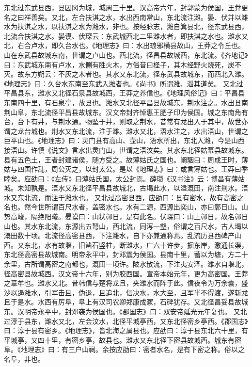 \documentclass[12pt,UTF8]{ctexbook}
\begin{document}
东北过东武县西，县因冈为城，城周三十里。汉高帝六年，封郭蒙为侯国，王莽更名之曰祥善矣。又北，左合扶淇之水，水出西南常山，东北流注潍。晏、伏并以潍水为扶淇之水，以扶淇之水为潍水，非也。按经脉志，潍自箕县北，径东武县西，北流合扶淇之水。晏谟、伏琛云：东武城西北二里潍水者，即扶淇之水也。潍水又北，右合卢水，即久台水也。《地理志》曰：水出琅邪横县故山，王莽之令丘也。山在东武县故城东南，世谓之卢山也。西北流，径昌县故城西，东北流。《齐地记》曰：东武城东南有卢水，水侧有胜火木，方俗音曰柽子，其木经野火烧死，炭不灭。故东方朔云：不灰之木者也。其水又东北流，径东武县故城东，而西北入潍。《地理志》曰：久台水东南至东武入潍者也。《尚书》所谓潍、淄其道矣。
又北过平昌县东，潍水又北径石泉县故城西，王莽之养信也。《地理风俗记》曰：平昌县东南四十里，有石泉亭，故县也。潍水又北径平昌县故城东，荆水注之。水出县南荆山阜，东北流径平昌县故城东。汉文帝封齐悼惠王肥子印为侯国。城之东南角有台，台下有井，与荆水通。物坠于井，则取之荆水，昔常有龙出入于其中，故世亦谓之龙台城也。荆水又东北流，注于潍。潍水又北，浯水注之，水出浯山，世谓之巨平山也。《地理志》曰：灵门县有高山、壶山，浯水所出，东北入潍，今是山西接浯山。许慎《说文》言水出灵门山，世谓之浯汶矣。其水东北径姑幕县故城东。县有五色土，王者封建诸侯，随方受之。故薄姑氏之国也。阚駰曰：周成王时，薄姑与四国作乱，周公灭之，以封太公。是以《地理志》曰：或言薄姑也。王莽曰季睦矣。应劭曰：《左传》曰薄姑氏国，太公封焉。薛瓒《汉书注》云：博昌有薄姑城。未知孰是。浯水又东北径平昌县故城北，古堨此水，以溢溉田，南注荆水。浯水又东北流，而注于潍水也。
又北过高密县西，应劭曰：县有密水，故有高密之名也。然今世所谓百尺水者，盖密水也。水有二源，西源出奕山，亦曰鄣日山。山势高峻，隔绝阳曦。晏谟曰：山状鄣日，是有此名。伏琛曰：山上鄣日，故名鄣日山也。其水东北流，东源出五弩山，西北流，同泻一壑，俗谓之百尺水，古人堨以溉田数十顷。北流径高密县西，下注潍水，自下亦兼通称焉。乱流历县西碑产山西。又东北，水有故堰，旧凿石竖柱，断潍水，广六十许步，掘东岸，激通长渠，东北径高密县故城南。明帝永平中，封邓震为侯国。县南十里，蓄以为塘，方二十余里，古所谓高密之南都也，溉田一顷许。陂水散流，下注夷安泽。潍水自堰北，径高密县故城西。汉文帝十六年，别为胶西国。宣帝本始元年，更为高密国。王莽之章牟也。潍水又北。昔韩信与楚将龙且，夹潍水而阵于此。信夜令为万余囊，盛沙以遏潍水，引军击且，伪退，且追北，信决水，水大至，且军半不得渡，遂斩龙且于是水。水西有厉阜，阜上有汉司农卿郑康成冢，石碑犹存。又北径昌妥县故城东。汉明帝永平中，封邓袭为侯国也。《郡国志》曰：双安帝延光元年复也。
又北过淳于县东，潍水又北，左会汶水，北径平城亭西，又东北径密乡亭西。《郡国志》曰：淳于县有密乡。《地理志》，皆北海之属县也。应劭曰：淳于县东北六十里，有平城亭，又四十里，有密乡亭，故县也。潍水又东北径下密县故城西。城东有密阜。《地理志》曰：有三户山祠。余按应劭曰：密者水名，是有下密之称。俗以之名阜，非也。
\end{document}

